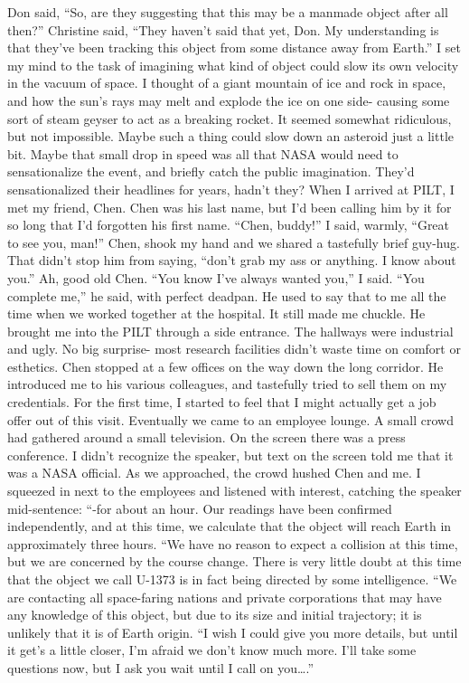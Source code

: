 \documentclass[a4paper]{article}
\begin{document}
Don said, “So, are they suggesting that this may be a manmade object after all then?”
Christine said, “They haven’t said that yet, Don. My understanding is that they’ve been tracking this object from some distance away from Earth.”
I set my mind to the task of imagining what kind of object could slow its own velocity in the vacuum of space. I thought of a giant mountain of ice and rock in space, and how the sun’s rays may melt and explode the ice on one side- causing some sort of steam geyser to act as a breaking rocket.
It seemed somewhat ridiculous, but not impossible. Maybe such a thing could slow down an asteroid just a little bit. Maybe that small drop in speed was all that NASA would need to sensationalize the event, and briefly catch the public imagination. They’d sensationalized their headlines for years, hadn’t they?
When I arrived at PILT, I met my friend, Chen. Chen was his last name, but I’d been calling him by it for so long that I’d forgotten his first name. “Chen, buddy!” I said, warmly, “Great to see you, man!”
Chen, shook my hand and we shared a tastefully brief guy-hug. That didn’t stop him from saying, “don’t grab my ass or anything. I know about you.”
Ah, good old Chen. “You know I’ve always wanted you,” I said.
“You complete me,” he said, with perfect deadpan. He used to say that to me all the time when we worked together at the hospital. It still made me chuckle.
He brought me into the PILT through a side entrance. The hallways were industrial and ugly. No big surprise- most research facilities didn’t waste time on comfort or esthetics.
Chen stopped at a few offices on the way down the long corridor. He introduced me to his various colleagues, and tastefully tried to sell them on my credentials. For the first time, I started to feel that I might actually get a job offer out of this visit.
Eventually we came to an employee lounge. A small crowd had gathered around a small television. On the screen there was a press conference. I didn’t recognize the speaker, but text on the screen told me that it was a NASA official. As we approached, the crowd hushed Chen and me.
I squeezed in next to the employees and listened with interest, catching the speaker mid-sentence: “-for about an hour. Our readings have been confirmed independently, and at this time, we calculate that the object will reach Earth in approximately three hours.
“We have no reason to expect a collision at this time, but we are concerned by the course change. There is very little doubt at this time that the object we call U-1373 is in fact being directed by some intelligence.
“We are contacting all space-faring nations and private corporations that may have any knowledge of this object, but due to its size and initial trajectory; it is unlikely that it is of Earth origin.
“I wish I could give you more details, but until it get’s a little closer, I’m afraid we don’t know much more. I’ll take some questions now, but I ask you wait until I call on you….”
\end{document}
